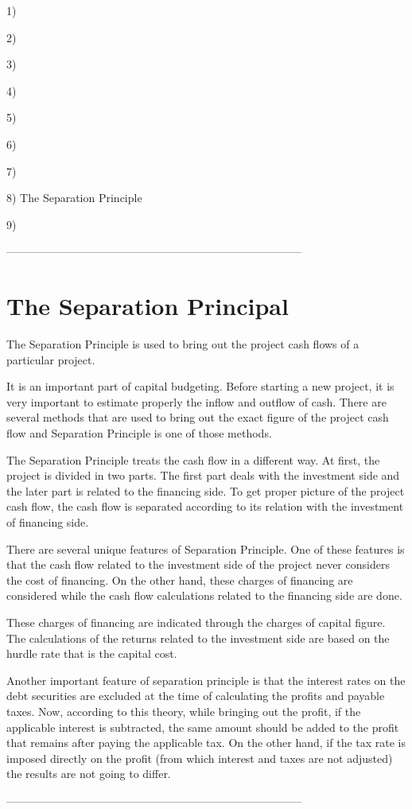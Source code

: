 1)

2)

3)

4)

5) 

6)

7) 

8) The Separation Principle

9) 




--------------------------------------------------------------------------------


\section{The Separation Principal}


The Separation Principle is used to bring out the project cash flows of a particular project. 

 

It is an important part of capital budgeting. Before starting a new project, it is very important to estimate properly the inflow and outflow of cash. There are several methods that are used to bring out the exact figure of the project cash flow and Separation Principle is one of those methods. 


The Separation Principle treats the cash flow in a different way. At first, the project is divided in two parts. The first part deals with the investment side and the later part is related to the financing side. To get proper picture of the project cash flow, the cash flow is separated according to its relation with the investment of financing side. 


There are several unique features of Separation Principle. One of these features is that the cash flow related to the investment side of the project never considers the cost of financing. On the other hand, these charges of financing are considered while the cash flow calculations related to the financing side are done. 

  

These charges of financing are indicated through the charges of capital figure. The calculations of the returns related to the investment side are based on the hurdle rate that is the capital cost. 


Another important feature of separation principle is that the interest rates on the debt securities are excluded at the time of calculating the profits and payable taxes. Now, according to this theory, while bringing out the profit, if the applicable interest is subtracted, the same amount should be added to the profit that remains after paying the applicable tax. On the other hand, if the tax rate is imposed directly on the profit (from which interest and taxes are not adjusted) the results are not going to differ. 




--------------------------------------------------------------------------------


